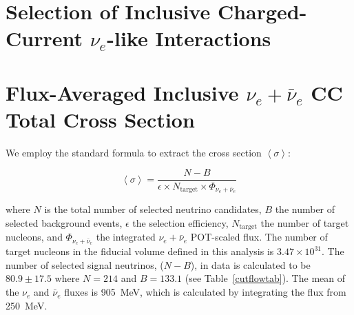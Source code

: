 \documentclass[%
 reprint,
 twocolumn,
superscriptaddress,
showpacs,preprintnumbers,
 amsmath,amssymb,
 aps,
prd,
longbibliography
]{revtex4-1}
\begin{document}



\section{Selection of Inclusive Charged-Current $\nu_e$-like Interactions}\label{sec:selection}


\section{Flux-Averaged Inclusive $\nu_e + \bar{\nu}_e$ CC Total Cross Section}\label{sec:xsec_measurement}

We employ the standard formula to extract the cross section $\left<\sigma\right>$:

\begin{equation}
    \left<\sigma\right> = \frac{N-B}{\epsilon \times N_{\text{target}} \times \Phi_{\nu_e + \bar{\nu}_e}}
\end{equation}


\noindent where $N$ is the total number of selected neutrino candidates, $B$ the number of selected background events, $\epsilon$ the selection efficiency, $N_{\text{target}}$ the number of target nucleons, and $\Phi_{\nu_e + \bar{\nu}_e}$ the integrated $\nu_e + \bar{\nu}_e$ POT-scaled flux. The number of target nucleons in the fiducial volume defined in this analysis is $3.47 \times 10^{31}$. The number of selected signal neutrinos, ($N - B$), in data is calculated to be $80.9 \pm 17.5$ where $N=214$ and $B = 133.1$ (see Table~\ref{cutflowtab}). The mean of the $\nu_e$ and $\bar{\nu}_e$ fluxes is 905~MeV, which is calculated by integrating the flux from 250~MeV. 
\end{document}
